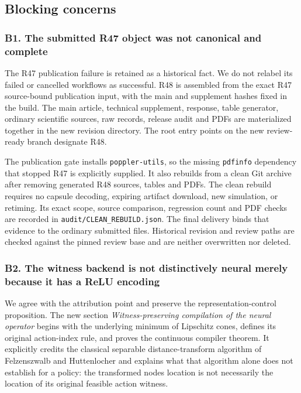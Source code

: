 \documentclass[ecta,nameyear,draft]{econsocart}
\begin{document}
\hypertarget{blocking-concerns}{%
\subsection{Blocking concerns}\label{blocking-concerns}}

\hypertarget{b1-the-submitted-r47-object-was-not-canonical-and-complete}{%
\subsubsection{B1. The submitted R47 object was not canonical and
complete}\label{b1-the-submitted-r47-object-was-not-canonical-and-complete}}

The R47 publication failure is retained as a historical fact. We do not
relabel its failed or cancelled workflows as successful. R48 is
assembled from the exact R47 source-bound publication input, with the
main and supplement hashes fixed in the build. The main article,
technical supplement, response, table generator, ordinary scientific
sources, raw records, release audit and PDFs are materialized together
in the new revision directory. The root entry points on the new
review-ready branch designate R48.

The publication gate installs \nolinkurl{poppler-utils}, so the missing
\nolinkurl{pdfinfo} dependency that stopped R47 is explicitly supplied. It
also rebuilds from a clean Git archive after removing generated R48
sources, tables and PDFs. The clean rebuild requires no capsule
decoding, expiring artifact download, new simulation, or retiming. Its
exact scope, source comparison, regression count and PDF checks are
recorded in \nolinkurl{audit/CLEAN_REBUILD.json}. The final delivery binds
that evidence to the ordinary submitted files. Historical revision and
review paths are checked against the pinned review base and are neither
overwritten nor deleted.

\hypertarget{b2-the-witness-backend-is-not-distinctively-neural-merely-because-it-has-a-relu-encoding}{%
\subsubsection{B2. The witness backend is not distinctively neural
merely because it has a ReLU
encoding}\label{b2-the-witness-backend-is-not-distinctively-neural-merely-because-it-has-a-relu-encoding}}

We agree with the attribution point and preserve the
representation-control proposition. The new section
\emph{Witness-preserving compilation of the neural operator} begins with
the underlying minimum of Lipschitz cones, defines its original
action-index rule, and proves the continuous compiler theorem. It
explicitly credits the classical separable distance-transform algorithm
of Felzenszwalb and Huttenlocher and explains what that algorithm alone
does not establish for a policy: the transformed node\textquotesingle s
location is not necessarily the location of its original feasible action
witness.
\end{document}
